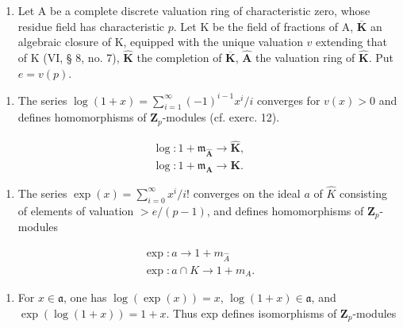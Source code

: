 \begin{enumerate}
\def\labelenumi{\arabic{enumi})}
\setcounter{enumi}{12}
\tightlist
\item
  Let A be a complete discrete valuation ring of characteristic zero, whose residue field has characteristic \(p\). Let K be the field of fractions of A, \(\overline{\mathbf{K}}\) an algebraic closure of K, equipped with the unique valuation \(v\) extending that of K (VI, § 8, no. 7), \(\hat{\mathbf{K}}\) the completion of \(\overline{\mathbf{K}}\), \(\hat{\mathbf{A}}\) the valuation ring of \(\hat{\mathbf{K}}\). Put \(e = v(p)\).
\end{enumerate}

\begin{enumerate}
\def\labelenumi{\alph{enumi})}
\tightlist
\item
  The series \(\log(1 + x) = \sum_{i=1}^{\infty} (-1)^{i-1} x^i / i\) converges for \(v(x) > 0\) and defines homomorphisms of \(\mathbf{Z}_p\)-modules (cf. exerc. 12).
\end{enumerate}

\[
\begin{array}{l} \log : 1 + \mathfrak {m} _ {\hat {\mathbf {A}}} \to \hat {\mathbf {K}}, \\ \log : 1 + \mathfrak {m} _ {\mathbf {A}} \to \mathbf {K}. \end{array}
\]

\begin{enumerate}
\def\labelenumi{\alph{enumi})}
\setcounter{enumi}{1}
\tightlist
\item
  The series \(\exp(x) = \sum_{i=0}^{\infty} x^{i}/i!\) converges on the ideal \(a\) of \(\hat{K}\) consisting of elements of valuation \(>e/(p-1)\), and defines homomorphisms of \(\mathbf{Z}_{p}\)-modules
\end{enumerate}

\[
\begin{array}{l} \exp : a \to 1 + m _ {\hat {A}} \\ \exp : a \cap K \to 1 + m _ {A}. \end{array}
\]

\begin{enumerate}
\def\labelenumi{\alph{enumi})}
\setcounter{enumi}{2}
\tightlist
\item
  For \(x \in \mathfrak{a}\), one has \(\log(\exp(x)) = x\), \(\log(1 + x) \in \mathfrak{a}\), and \(\exp(\log(1 + x)) = 1 + x\). Thus exp defines isomorphisms of \(\mathbf{Z}_p\)-modules
\end{enumerate}


